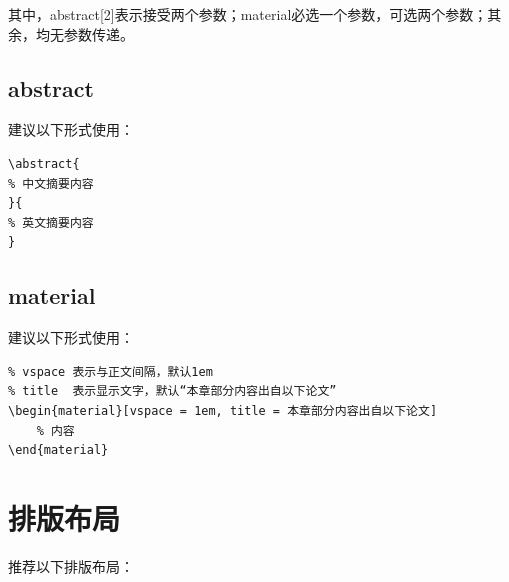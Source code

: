\documentclass{nuistthesis}
\begin{document}
其中，abstract[2]表示接受两个参数；material必选一个参数，可选两个参数；其余，均无参数传递。

\subsection{abstract}

建议以下形式使用：

\begin{lstlisting}
\abstract{
% 中文摘要内容
}{
% 英文摘要内容
}
\end{lstlisting}


\subsection{material}

建议以下形式使用：

\begin{lstlisting}
% vspace 表示与正文间隔，默认1em
% title  表示显示文字，默认“本章部分内容出自以下论文”
\begin{material}[vspace = 1em, title = 本章部分内容出自以下论文]
    % 内容
\end{material}
\end{lstlisting}

\section{排版布局}

推荐以下排版布局：
\end{document}
